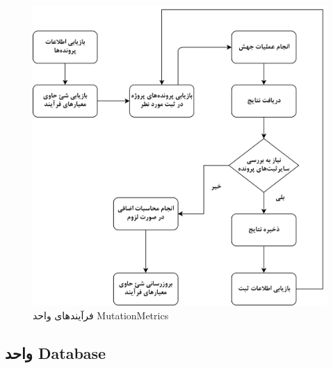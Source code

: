 \begin{figure}[H]
	\centering
	\includegraphics[width=.7\textwidth]{img/method/MutationMetrics-Chart.png}
	\caption{ فرآیند‌های واحد MutationMetrics}
	\label{fig:mutationmetircs-chart}
\end{figure}

\subsection{واحد Database}

